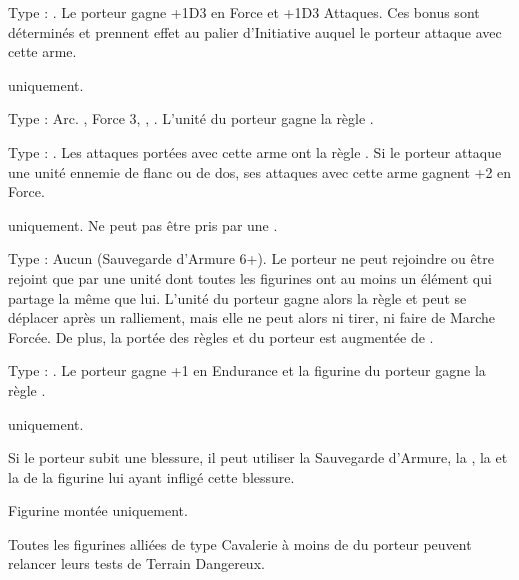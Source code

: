 Type : \hw{}. Le porteur gagne +1D3 en Force et +1D3 Attaques. Ces bonus sont déterminés et prennent effet au palier d'Initiative auquel le porteur attaque avec cette arme.

 \goblin{} uniquement.

Type : Arc. , Force 3, \lightningattacks{}, . L'unité du porteur gagne la règle \quicktofire{}.

Type : \hw{}. Les attaques portées avec cette arme ont la règle . Si le porteur attaque une unité ennemie de flanc ou de dos, ses attaques avec cette arme gagnent +2 en Force.

\endpricelist

\armymagicalarmour

\startpricelist

\goblin{} uniquement. Ne peut pas être pris par une \largetarget{}.

Type : Aucun (Sauvegarde d'Armure 6+). Le porteur ne peut rejoindre ou être rejoint que par une unité dont toutes les figurines ont au moins un élément qui partage la même \greenhiderace{} que lui. L'unité du porteur gagne alors la règle \vanguard{} et peut se déplacer après un ralliement, mais elle ne peut alors ni tirer, ni faire de Marche Forcée. De plus, la portée des règles \inspiringpresence{} et \holdyourground{} du porteur est augmentée de .

Type : \ha{}. Le porteur gagne +1 en Endurance et la figurine du porteur gagne la règle .

\endpricelist

\armytalismans

\startpricelist

\goblin{} uniquement.

Si le porteur subit une blessure, il peut utiliser la Sauvegarde d'Armure, la \wardsave{}, la \regeneration{} et la \magicresistance{} de la figurine lui ayant infligé cette blessure.

\endpricelist

\armyenchanteditems

\startpricelist

Figurine montée uniquement.

Toutes les figurines alliées de type Cavalerie à moins de  du porteur peuvent relancer leurs tests de Terrain Dangereux.

